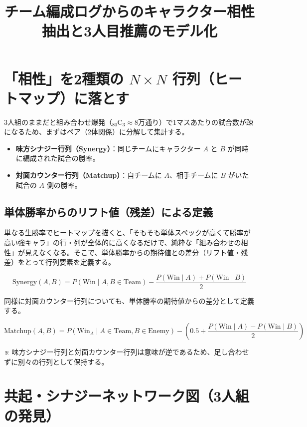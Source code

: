 \documentclass[a4paper,11pt]{ltjsarticle}
\title{チーム編成ログからのキャラクター相性抽出と3人目推薦のモデル化}
\author{}
\date{}
\begin{document}
\maketitle

\section{「相性」を2種類の $N \times N$ 行列（ヒートマップ）に落とす}

3人組のままだと組み合わせ爆発（${}_{80}\mathrm{C}_3 \approx 8\text{万通り}$）で1マスあたりの試合数が疎になるため、まずはペア（2体関係）に分解して集計する。

\begin{itemize}
  \item \textbf{味方シナジー行列（Synergy）}：同じチームにキャラクター $A$ と $B$ が同時に編成された試合の勝率。
  \item \textbf{対面カウンター行列（Matchup）}：自チームに $A$、相手チームに $B$ がいた試合の $A$ 側の勝率。
\end{itemize}

\subsection*{単体勝率からのリフト値（残差）による定義}

単なる生勝率でヒートマップを描くと、「そもそも単体スペックが高くて勝率が高い強キャラ」の行・列が全体的に高くなるだけで、純粋な「組み合わせの相性」が見えなくなる。そこで、単体勝率からの期待値との差分（リフト値・残差）をとって行列要素を定義する。

\begin{equation}
  \mathrm{Synergy}(A, B) = P(\mathrm{Win} \mid A, B \in \mathrm{Team}) - \frac{P(\mathrm{Win} \mid A) + P(\mathrm{Win} \mid B)}{2}
\end{equation}

同様に対面カウンター行列についても、単体勝率の期待値からの差分として定義する。

\begin{equation}
  \mathrm{Matchup}(A, B) = P(\mathrm{Win}_A \mid A \in \mathrm{Team}, B \in \mathrm{Enemy}) - \left( 0.5 + \frac{P(\mathrm{Win} \mid A) - P(\mathrm{Win} \mid B)}{2} \right)
\end{equation}

※ 味方シナジー行列と対面カウンター行列は意味が逆であるため、足し合わせずに別々の行列として保持する。

\section{共起・シナジーネットワーク図（3人組の発見）}
\end{document}
